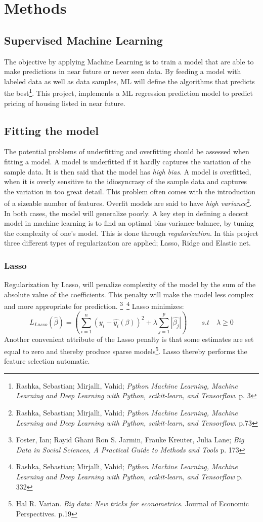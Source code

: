 \documentclass[12pt,a4paper]{article}
\begin{document}
\section{Methods}
\subsection{Supervised Machine Learning}
The objective by applying Machine Learning is to train a model that are able to make predictions in near future or never seen data. By feeding a model with labeled data as well as data samples, ML will define the algorithms that predicts the best\footnote{Rashka, Sebastian; Mirjalli, Vahid; \textit{Python Machine Learning, Machine Learning and Deep Learning with Python, scikit-learn, and Tensorflow}. p. 3}.   This project, implements a ML regression prediction model to predict pricing of housing listed in near future.
\subsection{Fitting the model}
The potential problems of underfitting and overfitting should be assessed when fitting a model. A model is underfitted if it hardly captures the variation of the sample data. It is then said that the model has \textit{high bias}. A model is overfitted, when it is overly sensitive to the idiosyncrasy of the sample data and captures the variation in too great detail. This problem often comes with the introduction of a sizeable number of features. Overfit models are said to have \textit{high variance}\footnote{Rashka, Sebastian; Mirjalli, Vahid; \textit{Python Machine Learning, Machine Learning and Deep Learning with Python, scikit-learn, and Tensorflow}. p.73}. In both cases, the model will generalize poorly. A key step in defining a decent model in machine learning is to find an optimal bias-variance-balance, by tuning the complexity of one’s model. This is done through \textit{regularization}. In this project three different types of regularization are applied; Lasso, Ridge and Elastic net.   

\subsubsection{Lasso}
Regularization by Lasso, will penalize complexity of the model by the sum of the absolute value of the coefficients. This penalty will make the model less complex and more appropriate for prediction.  \footnote{Foster, Ian; Rayid Ghani Ron S. Jarmin, Frauke Kreuter, Julia Lane; \textit{Big Data in Social Sciences, A Practical Guide to Methods and Tools} p. 173}\, \footnote{Rashka, Sebastian; Mirjalli, Vahid; \textit{Python Machine Learning, Machine Learning and Deep Learning with Python, scikit-learn, and Tensorflow} p. 332}
\newline Lasso minimizes: $$L_{Lasso}(\hat{\beta}) = \left(\sum_{i=1}^{n} (y_i-\hat{y_i}(\beta))^2+\lambda\sum_{j=1}^{p}|\hat{\beta_j}|\right) \qquad s.t \quad \lambda \geq 0 $$
Another convenient attribute of the Lasso penalty is that some estimates are set equal to zero and thereby produce sparse models\footnote{Hal R. Varian. \textit{Big data: New tricks for econometrics}. Journal of Economic Perspectives. p.19}. Lasso thereby performs the feature selection automatic.   
\end{document}
